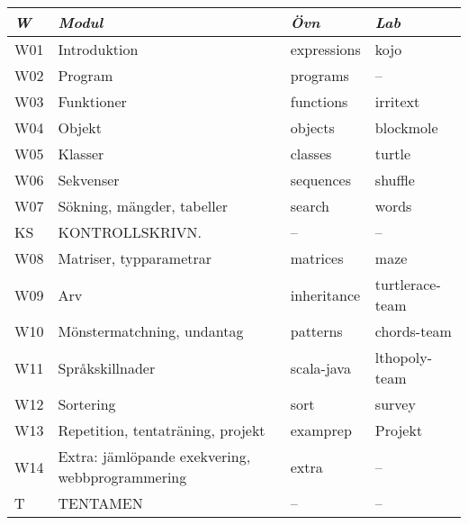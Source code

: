 \begin{tabular}{l|l|l|l}
\textit{W} & \textit{Modul} & \textit{Övn} & \textit{Lab} \\ \hline \hline
W01 & Introduktion & expressions & kojo \\
W02 & Program & programs & -- \\
W03 & Funktioner & functions & irritext \\
W04 & Objekt & objects & blockmole \\
W05 & Klasser & classes & turtle \\
W06 & Sekvenser & sequences & shuffle \\
W07 & Sökning, mängder, tabeller & search & words \\
KS & KONTROLLSKRIVN. & -- & -- \\
W08 & Matriser, typparametrar & matrices & maze \\
W09 & Arv & inheritance & turtlerace-team \\
W10 & Mönstermatchning, undantag & patterns & chords-team \\
W11 & Språkskillnader & scala-java & lthopoly-team \\
W12 & Sortering & sort & survey \\
W13 & Repetition, tentaträning, projekt & examprep & Projekt \\
W14 & Extra: jämlöpande exekvering, webbprogrammering & extra & -- \\
T & TENTAMEN & -- & -- \\
\end{tabular}
